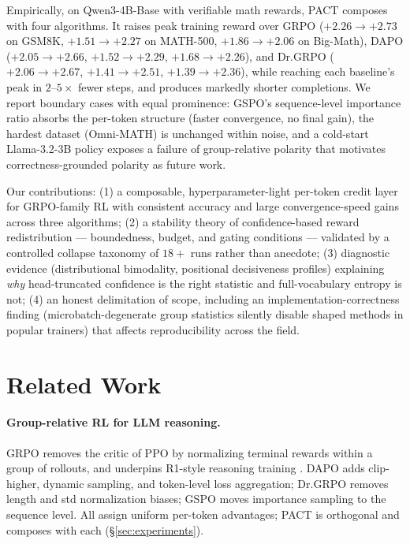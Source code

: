 \documentclass{article} %
\theoremstyle{plain}
\theoremstyle{definition}
\theoremstyle{remark}
\newcommand{\method}{PACT}
\begin{document}
Empirically, on Qwen3-4B-Base \citep{yang2025qwen3} with verifiable math rewards, \method{} composes with four algorithms. It raises peak training reward over GRPO ($+2.26 \to +2.73$ on GSM8K, $+1.51\to+2.27$ on MATH-500, $+1.86\to+2.06$ on Big-Math), DAPO ($+2.05\to+2.66$, $+1.52\to+2.29$, $+1.68\to+2.26$), and Dr.GRPO ($+2.06\to+2.67$, $+1.41\to+2.51$, $+1.39\to+2.36$), while reaching each baseline's peak in $2$--$5\times$ fewer steps, and produces markedly shorter completions. We report boundary cases with equal prominence: GSPO's sequence-level importance ratio absorbs the per-token structure (faster convergence, no final gain), the hardest dataset (Omni-MATH) is unchanged within noise, and a cold-start Llama-3.2-3B policy exposes a failure of group-relative polarity that motivates correctness-grounded polarity as future work.

Our contributions: (1) a composable, hyperparameter-light per-token credit layer for GRPO-family RL with consistent accuracy and large convergence-speed gains across three algorithms; (2) a stability theory of confidence-based reward redistribution --- boundedness, budget, and gating conditions --- validated by a controlled collapse taxonomy of $18{+}$ runs rather than anecdote; (3) diagnostic evidence (distributional bimodality, positional decisiveness profiles) explaining \emph{why} head-truncated confidence is the right statistic and full-vocabulary entropy is not; (4) an honest delimitation of scope, including an implementation-correctness finding (microbatch-degenerate group statistics silently disable shaped methods in popular trainers) that affects reproducibility across the field.

\section{Related Work}
\label{sec:related}

\paragraph{Group-relative RL for LLM reasoning.} GRPO \citep{shao2024deepseekmath} removes the critic of PPO \citep{schulman2017ppo} by normalizing terminal rewards within a group of rollouts, and underpins R1-style reasoning training \citep{guo2025deepseek}. DAPO \citep{yu2025dapo} adds clip-higher, dynamic sampling, and token-level loss aggregation; Dr.GRPO \citep{liu2025drgrpo} removes length and std normalization biases; GSPO \citep{zheng2025gspo} moves importance sampling to the sequence level. All assign uniform per-token advantages; \method{} is orthogonal and composes with each (\S\ref{sec:experiments}).
\end{document}
